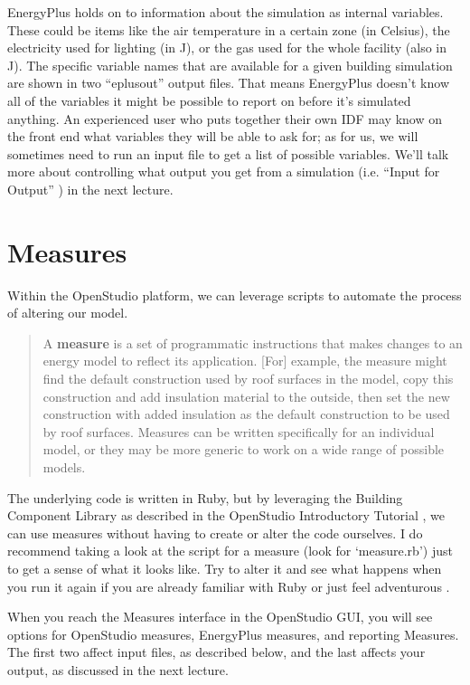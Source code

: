 \documentclass[10pt]{article}
\begin{document}
EnergyPlus holds on to information about the simulation as internal variables. These could be items like the air temperature in a certain zone (in Celsius), the electricity used for lighting (in J), or the gas used for the whole facility (also in J). The specific variable names that are available for a given building simulation are shown in two ``eplusout'' output files. That means EnergyPlus doesn't know all of the variables it might be possible to report on before it's simulated anything. An experienced user who puts together their own IDF may know on the front end what variables they will be able to ask for; as for us, we will sometimes need to run an input file to get a list of possible variables. We'll talk more about controlling what output you get from a simulation (i.e. ``Input for Output'' \cite{EP9docs}) in the next lecture.

\section{Measures}

Within the OpenStudio platform, we can leverage scripts to automate the process of altering our model. 

\begin{quote}
    A \textbf{measure} is a set of programmatic instructions that makes changes to an energy model to reflect its application. [For] example, the measure might find the default construction used by roof surfaces in the model, copy this construction and add insulation material to the outside, then set the new construction with added insulation as the default construction to be used by roof surfaces. Measures can be written specifically for an individual model, or they may be more generic to work on a wide range of possible models. \cite{noauthor_undated-ve}
\end{quote}

The underlying code is written in Ruby, but by leveraging the Building Component Library \cite{noauthor_undated-hy} as described in the OpenStudio Introductory Tutorial \cite{noauthor_undated-fr}, we can use measures without having to create or alter the code ourselves. I do recommend taking a look at the script for a measure (look for `measure.rb') just to get a sense of what it looks like. Try to alter it and see what happens when you run it again if you are already familiar with Ruby or just feel adventurous \cite{Smith2018-vw}.

When you reach the Measures interface in the OpenStudio GUI, you will see options for OpenStudio measures, EnergyPlus measures, and reporting Measures. The first two affect input files, as described below, and the last affects your output, as discussed in the next lecture.
\end{document}
